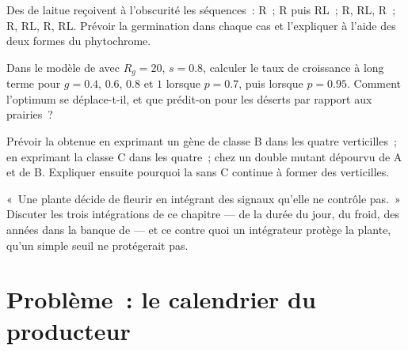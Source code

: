 \begin{exercise}[$\star\star$]\label{exo:b2:plant-flowering:9}
Des  de laitue reçoivent à l'obscurité les séquences~: R~; R puis
RL~; R, RL, R~; R, RL, R, RL. Prévoir la germination dans chaque cas et
l'expliquer à l'aide des deux formes du phytochrome.
\end{exercise}

\begin{exercise}[$\star\star\star$]\label{exo:b2:plant-flowering:10}
Dans le modèle de  avec $R_g = 20$,
$s = 0.8$, calculer le taux de croissance à long terme pour $g = 0.4$,
$0.6$, $0.8$ et $1$ lorsque
$p = 0.7$, puis lorsque $p = 0.95$. Comment l'optimum se déplace-t-il,
et que prédit-on pour les déserts par rapport aux prairies~?
\end{exercise}

\begin{exercise}[$\star\star\star$]\label{exo:b2:plant-flowering:11}
Prévoir la  obtenue en exprimant un gène de classe B dans les
quatre verticilles~; en exprimant la classe C dans les quatre~; chez un
double mutant dépourvu de A et de B. Expliquer ensuite pourquoi la 
sans C continue à former des verticilles.
\end{exercise}

\begin{exercise}[$\star\star\star$]\label{exo:b2:plant-flowering:12}
«~Une plante décide de fleurir en intégrant des signaux qu'elle ne
contrôle pas.~» Discuter les trois intégrations de ce chapitre --- de la
durée du jour, du froid, des années dans la banque de  --- et ce
contre quoi un intégrateur protège la plante, qu'un simple seuil ne
protégerait pas.
\end{exercise}

\section{Problème~: le calendrier du producteur}

